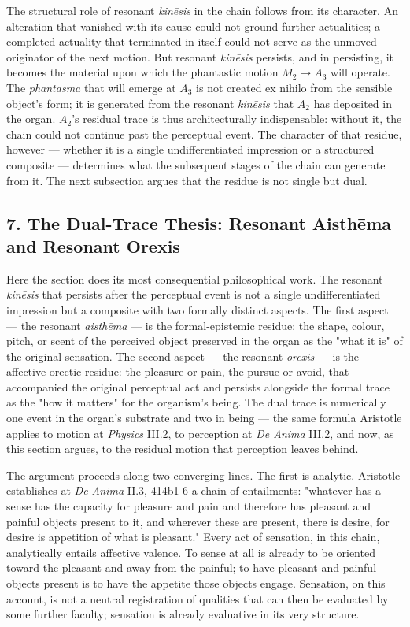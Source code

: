 \documentclass[12pt]{article}
\begin{document}
The structural role of resonant \textit{kinēsis} in the chain follows from its character. An alteration that vanished with its cause could not ground further actualities; a completed actuality that terminated in itself could not serve as the unmoved originator of the next motion. But resonant \textit{kinēsis} persists, and in persisting, it becomes the material upon which the phantastic motion $M_2$$\to$$A_3$ will operate. The \textit{phantasma} that will emerge at $A_3$ is not created ex nihilo from the sensible object's form; it is generated from the resonant \textit{kinēsis} that $A_2$ has deposited in the organ. $A_2$'s residual trace is thus architecturally indispensable: without it, the chain could not continue past the perceptual event. The character of that residue, however --- whether it is a single undifferentiated impression or a structured composite --- determines what the subsequent stages of the chain can generate from it. The next subsection argues that the residue is not single but dual.

\subsection*{7. The Dual-Trace Thesis: Resonant Aisthēma and Resonant Orexis}

Here the section does its most consequential philosophical work. The resonant \textit{kinēsis} that persists after the perceptual event is not a single undifferentiated impression but a composite with two formally distinct aspects. The first aspect --- the resonant \textit{aisthēma} --- is the formal-epistemic residue: the shape, colour, pitch, or scent of the perceived object preserved in the organ as the "what it is" of the original sensation. The second aspect --- the resonant \textit{orexis} --- is the affective-orectic residue: the pleasure or pain, the pursue or avoid, that accompanied the original perceptual act and persists alongside the formal trace as the "how it matters" for the organism's being. The dual trace is numerically one event in the organ's substrate and two in being --- the same formula Aristotle applies to motion at \textit{Physics} III.2, to perception at \textit{De Anima} III.2, and now, as this section argues, to the residual motion that perception leaves behind.

The argument proceeds along two converging lines. The first is analytic. Aristotle establishes at \textit{De Anima} II.3, 414b1-6 a chain of entailments: "whatever has a sense has the capacity for pleasure and pain and therefore has pleasant and painful objects present to it, and wherever these are present, there is desire, for desire is appetition of what is pleasant." Every act of sensation, in this chain, analytically entails affective valence. To sense at all is already to be oriented toward the pleasant and away from the painful; to have pleasant and painful objects present is to have the appetite those objects engage. Sensation, on this account, is not a neutral registration of qualities that can then be evaluated by some further faculty; sensation is already evaluative in its very structure.
\end{document}
